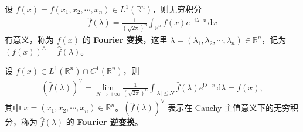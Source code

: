 \documentclass[../../main.tex]{subfiles}%
\begin{document}
\begin{definition}
设 $f(x)=f(x_1,x_2,\cdots,x_n)\in L^1(\mathbb{R}^n)$，则无穷积分
\begin{align}
\hat{f}(\lambda)=\frac{1}{(\sqrt{2\pi})^n}\int_{\mathbb{R}^n}f(x)e^{-\mathrm{i}\lambda \cdot x}\,\mathrm{d}x \label{eq:fourier-multidim}
\end{align}
有意义，称为 $f(x)$ 的 \textbf{Fourier 变换}，这里 $\lambda=(\lambda_1,\lambda_2,\cdots,\lambda_n)\in\mathbb{R}^n$，记为 $(f(x))^\wedge=\hat{f}(\lambda)$。
\end{definition}

\begin{theorem}[反演公式]
设 $f(x)\in L^1(\mathbb{R}^n)\cap C^1(\mathbb{R}^n)$，则
\begin{align}
(\hat{f}(\lambda))^\vee=\lim_{N\to+\infty}\frac{1}{(\sqrt{2\pi})^n}\int_{|\lambda|\leqslant N}\hat{f}(\lambda)e^{\mathrm{i}\lambda \cdot x}\,\mathrm{d}\lambda=f(x), \label{eq:fourier-inv-multidim}
\end{align}
其中 $x=(x_1,x_2,\cdots,x_n)\in\mathbb{R}^n$。$(\hat{f}(\lambda))^\vee$ 表示在 Cauchy 主值意义下的无穷积分，称为 $\hat{f}(\lambda)$ 的 \textbf{Fourier 逆变换}。
\end{theorem}
\end{document}
